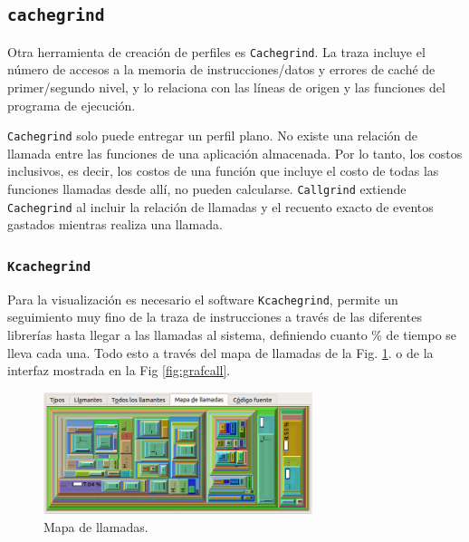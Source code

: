 \documentclass[a4paper]{article}
\begin{document}
\subsection{\texttt{cachegrind}}
Otra herramienta de creación de perfiles es \texttt{Cachegrind}.
La traza incluye el número de accesos a la memoria de instrucciones/datos y errores de caché de primer/segundo nivel, y lo relaciona con las líneas de origen y las funciones del programa de ejecución. 

\texttt{Cachegrind} solo puede entregar un perfil plano. No existe una relación de llamada entre las funciones de una aplicación almacenada. Por lo tanto, los costos inclusivos, es decir, los costos de una función que incluye el costo de todas las funciones llamadas desde allí, no pueden calcularse. \texttt{Callgrind} extiende \texttt{Cachegrind} al incluir la relación de llamadas y el recuento exacto de eventos gastados mientras realiza una llamada.

\subsubsection{\texttt{Kcachegrind}}

Para la visualización es necesario el software \texttt{Kcachegrind}, permite un seguimiento muy fino de la traza de instrucciones a través de las diferentes librerías hasta llegar a las llamadas al sistema, definiendo cuanto \% de tiempo se lleva cada una. Todo esto a través del mapa de llamadas de la Fig. \ref{fig:callmap}. o de la interfaz mostrada en la Fig \ref{fig:grafcall}.

\begin{figure}[H]
	\begin{center}		
	\includegraphics[width=0.7\textwidth]{007.png}
  	\caption{Mapa de llamadas.}
  	\label{fig:callmap}
  	\end{center}
\end{figure}
\end{document}
